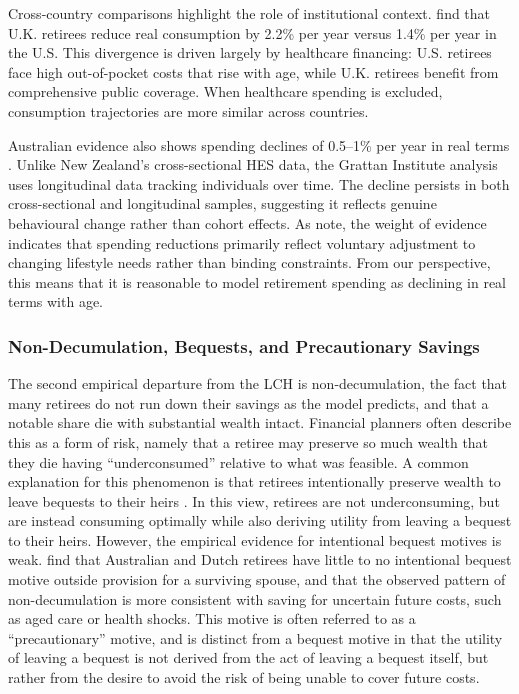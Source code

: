 \documentclass[11pt]{article}
\begin{document}
Cross-country comparisons highlight the role of institutional context. \textcite{banks2016lifeCycle} find that U.K. retirees reduce real consumption by 2.2\% per year versus 1.4\% per year in the U.S. This divergence is driven largely by healthcare financing: U.S. retirees face high out-of-pocket costs that rise with age, while U.K. retirees benefit from comprehensive public coverage. When healthcare spending is excluded, consumption trajectories are more similar across countries.

Australian evidence also shows spending declines of 0.5--1\% per year in real terms \parencite{grattan2019savingsBehaviourOlderHouseholds}. Unlike New Zealand's cross-sectional HES data, the Grattan Institute analysis uses longitudinal data tracking individuals over time. The decline persists in both cross-sectional and longitudinal samples, suggesting it reflects genuine behavioural change rather than cohort effects. As \textcite{riig2024spending} note, the weight of evidence indicates that spending reductions primarily reflect voluntary adjustment to changing lifestyle needs rather than binding constraints. From our perspective, this means that it is reasonable to model retirement spending as declining in real terms with age.

\subsubsection{Non-Decumulation, Bequests, and Precautionary Savings}

The second empirical departure from the LCH is non-decumulation, the fact that many retirees do not run down their savings as the model predicts, and that a notable share die with substantial wealth intact. Financial planners often describe this as a form of risk, namely that a retiree may preserve so much wealth that they die having ``underconsumed'' relative to what was feasible. A common explanation for this phenomenon is that retirees intentionally preserve wealth to leave bequests to their heirs \parencite[e.g.][]{hurd1987savings}. In this view, retirees are not underconsuming, but are instead consuming optimally while also deriving utility from leaving a bequest to their heirs. However, the empirical evidence for intentional bequest motives is weak. \textcite{alonso-garcia2022saving} find that Australian and Dutch retirees have little to no intentional bequest motive outside provision for a surviving spouse, and that the observed pattern of non-decumulation is more consistent with saving for uncertain future costs, such as aged care or health shocks. This motive is often referred to as a ``precautionary'' motive, and is distinct from a bequest motive in that the utility of leaving a bequest is not derived from the act of leaving a bequest itself, but rather from the desire to avoid the risk of being unable to cover future costs.
\end{document}
